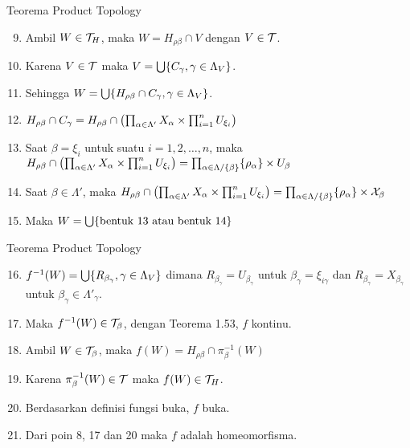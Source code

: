 \begin{frame}{Teorema Product Topology}
    \begin{tcolorbox}[enhanced,title=Teorema 2.39 (Bukti), frame style tile={width=\paperwidth}{\wallpaper}]
        \begin{enumerate}\setcounter{enumi}{8}
            \item Ambil $W\in\nT_H$, maka $W = H_{\rho\beta}\cap V$ dengan $V\in\nT$.
            \item Karena $V\in\nT$ maka $V = \bigcup\set*{C_\gamma, \gamma\in\Lambda_V}$.
            \item Sehingga $W=\bigcup\set*{H_{\rho\beta}\cap C_\gamma, \gamma\in\Lambda_V}$.
            \item $H_{\rho\beta}\cap C_\gamma = 
            H_{\rho\beta}\cap \oio*{\prod_{\alpha\in\Lambda'}X_\alpha\times\prod_{i=1}^n U_{\xi_i}}$
            \item Saat $\beta = \xi_i$ untuk suatu $i=1,2,\dots,n$, maka $H_{\rho\beta}\cap \oio*{\prod_{\alpha\in\Lambda'}X_\alpha\times\prod_{i=1}^n U_{\xi_i}}
            =\prod_{\alpha\in\Lambda/\set{\beta}}\set{\rho_\alpha}\times U_{\beta}$
            \item Saat $\beta \in \Lambda'$, maka $H_{\rho\beta}\cap \oio*{\prod_{\alpha\in\Lambda'}X_\alpha\times\prod_{i=1}^n U_{\xi_i}}
            =\prod_{\alpha\in\Lambda/\set{\beta}}\set{\rho_\alpha}\times \nX_{\beta}$
            \item Maka $W=\bigcup\set*{\text{bentuk } 13 \text{ atau }\text{bentuk }14}$
        \end{enumerate}
    \end{tcolorbox}
\end{frame}

\begin{frame}{Teorema Product Topology}
    \begin{tcolorbox}[enhanced,title=Teorema 2.39 (Bukti), frame style tile={width=\paperwidth}{\wallpaper}]
        \begin{enumerate}\setcounter{enumi}{15}
            \item $f^{-1}(W) = \bigcup\set{R_{\beta_\gamma}, \gamma\in\Lambda_V}$ dimana
            $R_{\beta_\gamma}=U_{\beta_\gamma}$ untuk $\beta_\gamma = \xi_{i\gamma}$ dan
            $R_{\beta_\gamma}=X_{\beta_\gamma}$ untuk $\beta_\gamma \in \Lambda'_\gamma$.
            \item Maka $f^{-1}(W) \in \nT_\beta$, dengan Teorema 1.53, $f$ kontinu.
            \item Ambil $W \in \nT_\beta$, maka $f(W) = H_{\rho\beta}\cap\pi_\beta^{-1}(W)$
            \item Karena $\pi_\beta^{-1}(W)\in\nT$ maka $f(W)\in \nT_H$.
            \item Berdasarkan definisi fungsi buka, $f$ buka.
            \item Dari poin 8, 17 dan 20 maka $f$ adalah homeomorfisma.
        \end{enumerate}
    \end{tcolorbox}
\end{frame}